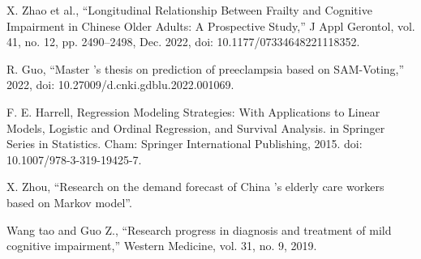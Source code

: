 \documentclass{base}
\begin{document}
\noindent[10] X. Zhao et al., “Longitudinal Relationship Between Frailty and Cognitive Impairment in Chinese Older Adults: A Prospective Study,” J Appl Gerontol, vol. 41, no. 12, pp. 2490–2498, Dec. 2022, doi: 10.1177/07334648221118352.

\noindent[11] R. Guo, “Master ’s thesis on prediction of preeclampsia based on SAM-Voting,” 2022, doi: 10.27009/d.cnki.gdblu.2022.001069.

\noindent[12] F. E. Harrell, Regression Modeling Strategies: With Applications to Linear Models, Logistic and Ordinal Regression, and Survival Analysis. in Springer Series in Statistics. Cham: Springer International Publishing, 2015. doi: 10.1007/978-3-319-19425-7.

\noindent[13] X. Zhou, “Research on the demand forecast of China ’s elderly care workers based on Markov model”.

\noindent[14] Wang  tao and Guo Z., “Research progress in diagnosis and treatment of mild cognitive impairment,” Western Medicine, vol. 31, no. 9, 2019.
\end{document}

